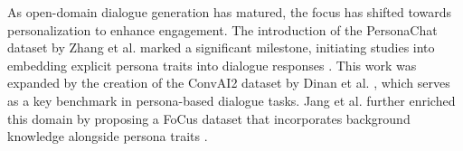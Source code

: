 \documentclass[letterpaper]{article} %
\begin{document}



As open-domain dialogue generation has matured, the focus has shifted towards personalization to enhance engagement. The introduction of the PersonaChat dataset by Zhang et al. marked a significant milestone, initiating studies into embedding explicit persona traits into dialogue responses \cite{zhang-etal-2018-personalizing}. This work was expanded by the creation of the ConvAI2 dataset by Dinan et al. \cite{dinan-etal-2019-convai2}, which serves as a key benchmark in persona-based dialogue tasks. Jang et al. further enriched this domain by proposing a FoCus dataset that incorporates background knowledge alongside persona traits \cite{jang-etal-2022-focus}.
\end{document}
